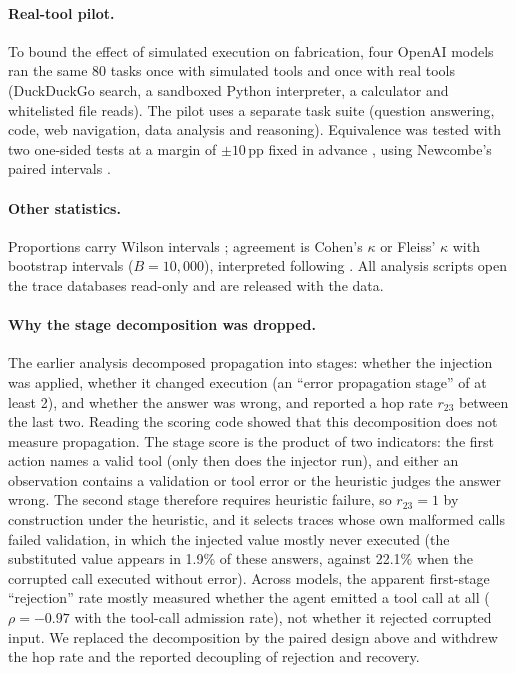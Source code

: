 \documentclass[pdflatex,sn-mathphys-num,Numbered]{sn-jnl}
\newcommand{\pp}{\,pp}
\begin{document}
\paragraph{Real-tool pilot.} To bound the effect of simulated execution on fabrication, four OpenAI models ran the same 80 tasks once with simulated tools and once with real tools (DuckDuckGo search, a sandboxed Python interpreter, a calculator and whitelisted file reads). The pilot uses a separate task suite (question answering, code, web navigation, data analysis and reasoning). Equivalence was tested with two one-sided tests at a margin of $\pm10$\pp{} fixed in advance \cite{schuirmann1987tost}, using Newcombe's paired intervals \cite{newcombe1998paired}.

\paragraph{Other statistics.} Proportions carry Wilson intervals \cite{wilson1927}; agreement is Cohen's $\kappa$ \cite{cohen1960kappa} or Fleiss' $\kappa$ \cite{fleiss1971kappa} with bootstrap intervals ($B=10{,}000$), interpreted following \cite{landis1977kappa}. All analysis scripts open the trace databases read-only and are released with the data.

\paragraph{Why the stage decomposition was dropped.}\label{sec:hop}
The earlier analysis decomposed propagation into stages: whether the injection was applied, whether it changed execution (an ``error propagation stage'' of at least 2), and whether the answer was wrong, and reported a hop rate $r_{23}$ between the last two. Reading the scoring code showed that this decomposition does not measure propagation. The stage score is the product of two indicators: the first action names a valid tool (only then does the injector run), and either an observation contains a validation or tool error or the heuristic judges the answer wrong. The second stage therefore requires heuristic failure, so $r_{23}=1$ by construction under the heuristic, and it selects traces whose own malformed calls failed validation, in which the injected value mostly never executed (the substituted value appears in 1.9\% of these answers, against 22.1\% when the corrupted call executed without error). Across models, the apparent first-stage ``rejection'' rate mostly measured whether the agent emitted a tool call at all ($\rho=-0.97$ with the tool-call admission rate), not whether it rejected corrupted input. We replaced the decomposition by the paired design above and withdrew the hop rate and the reported decoupling of rejection and recovery.
\end{document}
